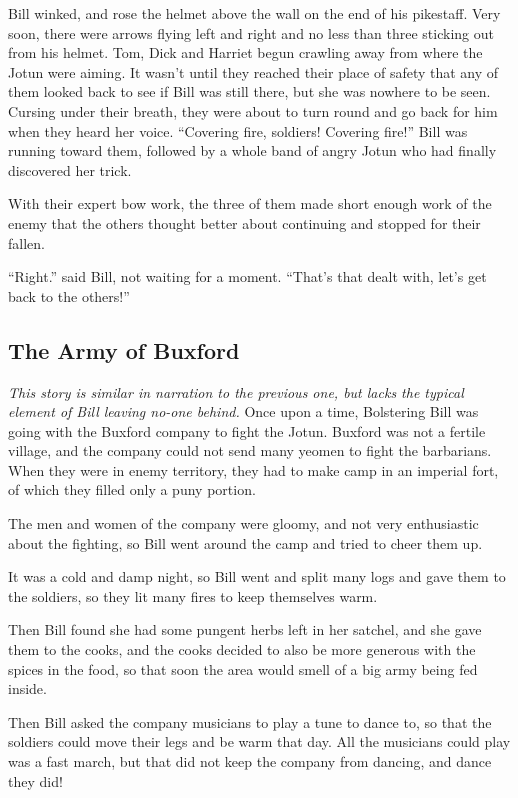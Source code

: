 Bill winked, and rose the helmet above the wall on the end of his pikestaff. Very soon, there were arrows flying left and right and no less than three sticking out from his helmet. Tom, Dick and Harriet begun crawling away from where the Jotun were aiming. It wasn't until they reached their place of safety that any of them looked back to see if Bill was still there, but she was nowhere to be seen. Cursing under their breath, they were about to turn round and go back for him when they heard her voice. “Covering fire, soldiers! Covering fire!” Bill was running toward them, followed by a whole band of angry Jotun who had finally discovered her trick.

With their expert bow work, the three of them made short enough work of the enemy that the others thought better about continuing and stopped for their fallen.

“Right.” said Bill, not waiting for a moment. “That's that dealt with, let's get back to the others!” 
\subsection{The Army of Buxford}
\textit{This story is similar in narration to the previous one, but lacks the typical element of Bill leaving no-one behind.}
Once upon a time, Bolstering Bill was going with the Buxford company to fight the Jotun. Buxford was not a fertile village, and the company could not send many yeomen to fight the barbarians. When they were in enemy territory, they had to make camp in an imperial fort, of which they filled only a puny portion.

The men and women of the company were gloomy, and not very enthusiastic about the fighting, so Bill went around the camp and tried to cheer them up. 

It was a cold and damp night, so Bill went and split many logs and gave them to the soldiers, so they lit many fires to keep themselves warm.

Then Bill found she had some pungent herbs left in her satchel, and she gave them to the cooks, and the cooks decided to also be more generous with the spices in the food, so that soon the area would smell of a big army being fed inside.

Then Bill asked the company musicians to play a tune to dance to, so that the soldiers could move their legs and be warm that day. All the musicians could play was a fast march, but that did not keep the company from dancing, and dance they did!

